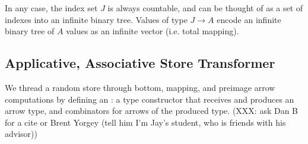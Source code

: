 \documentclass[preprint]{sigplanconf}
\begin{document}
In any case, the index set $J$ is always countable, and can be thought of as a set of indexes into an infinite binary tree.
Values of type $J \to A$ encode an infinite binary tree of $A$ values as an infinite vector (i.e. total mapping).

\subsection{Applicative, Associative Store Transformer}

We thread a random store through bottom, mapping, and preimage arrow computations by defining an : a type constructor that receives and produces an arrow type, and combinators for arrows of the produced type. (XXX: ask Dan B for a cite or Brent Yorgey (tell him I'm Jay's student, who is friends with his advisor))
\end{document}
